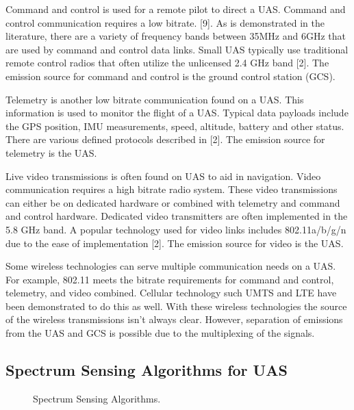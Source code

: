 \documentclass[journal,transmag]{IEEEtran}
\begin{document}
Command and control is used for a remote pilot to direct a UAS. Command and control communication requires a low bitrate. [9]. As is demonstrated in the literature, there are a variety of frequency bands between 35MHz and 6GHz that are used by command and control data links.  Small UAS typically use traditional remote control radios that often utilize the unlicensed 2.4 GHz band [2]. The emission source for command and control is the ground control station (GCS). 

Telemetry is another low bitrate communication found on a UAS. This information is used to monitor the flight of a UAS. Typical data payloads include the GPS position, IMU measurements, speed, altitude, battery and other status. There are various defined protocols described in [2]. The emission source for telemetry is the UAS.

Live video transmissions is often found on UAS to aid in navigation. Video communication requires a high bitrate radio system. These video transmissions can either be on dedicated hardware or combined with telemetry and command and control hardware. Dedicated video transmitters are often implemented in the 5.8 GHz band. A popular technology used for video links includes 802.11a/b/g/n due to the ease of implementation [2]. The emission source for video is the UAS.

Some wireless technologies can serve multiple communication needs on a UAS. For example, 802.11 meets the bitrate requirements for command and control, telemetry, and video combined. Cellular technology such UMTS and LTE have been demonstrated to do this as well. With these wireless technologies the source of the wireless transmissions isn’t always clear. However, separation of emissions from the UAS and GCS is possible due to the multiplexing of the signals.

\subsection{Spectrum Sensing Algorithms for UAS}

\begin{figure}[htbp]
\caption{Spectrum Sensing Algorithms.}
\label{fig}
\end{figure}
\end{document}
